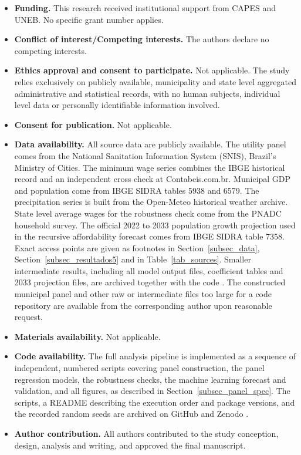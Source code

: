 \documentclass[pdflatex,sn-mathphys-num]{sn-jnl}%
\theoremstyle{thmstyleone}%
\theoremstyle{thmstyletwo}%
\theoremstyle{thmstylethree}%
\begin{document}
\begin{itemize}
\item \textbf{Funding.} This research received institutional support from CAPES and UNEB. No specific grant number applies.
\item \textbf{Conflict of interest/Competing interests.} The authors declare no competing interests.
\item \textbf{Ethics approval and consent to participate.} Not applicable. The study relies exclusively on publicly available, municipality and state level aggregated administrative and statistical records, with no human subjects, individual level data or personally identifiable information involved.
\item \textbf{Consent for publication.} Not applicable.
\item \textbf{Data availability.} All source data are publicly available. The utility panel comes from the National Sanitation Information System (SNIS), Brazil's Ministry of Cities. The minimum wage series combines the IBGE historical record and an independent cross check at Contabeis.com.br. Municipal GDP and population come from IBGE SIDRA tables 5938 and 6579. The precipitation series is built from the Open-Meteo historical weather archive. State level average wages for the robustness check come from the PNADC household survey. The official 2022 to 2033 population growth projection used in the recursive affordability forecast comes from IBGE SIDRA table 7358. Exact access points are given as footnotes in Section~\ref{subsec_data}, Section~\ref{subsec_resultados5} and in Table~\ref{tab_sources}. Smaller intermediate results, including all model output files, coefficient tables and 2033 projection files, are archived together with the code \citep{Figueredo2026Repo}. The constructed municipal panel and other raw or intermediate files too large for a code repository are available from the corresponding author upon reasonable request.
\item \textbf{Materials availability.} Not applicable.
\item \textbf{Code availability.} The full analysis pipeline is implemented as a sequence of independent, numbered scripts covering panel construction, the panel regression models, the robustness checks, the machine learning forecast and validation, and all figures, as described in Section~\ref{subsec_panel_spec}. The scripts, a README describing the execution order and package versions, and the recorded random seeds are archived on GitHub and Zenodo \citep{Figueredo2026Repo}.
\item \textbf{Author contribution.} All authors contributed to the study conception, design, analysis and writing, and approved the final manuscript.
\end{itemize}
\end{document}
